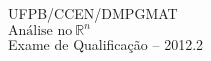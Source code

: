 \documentclass[11pt]{report}
\begin{document}
	\thispagestyle{empty}
	
	\noindent
	\begin{minipage}[c]{1.0\linewidth}
		\begin{center}
			UFPB/CCEN/DMPGMAT \\
			$\mbox{Análise no} \ \mathbb{R}^{n}$ \\
			Exame de Qualificação -- 2012.2
		\end{center}
	\end{minipage}
	
	\vspace{0.8cm}
	
	
	
\end{document}
